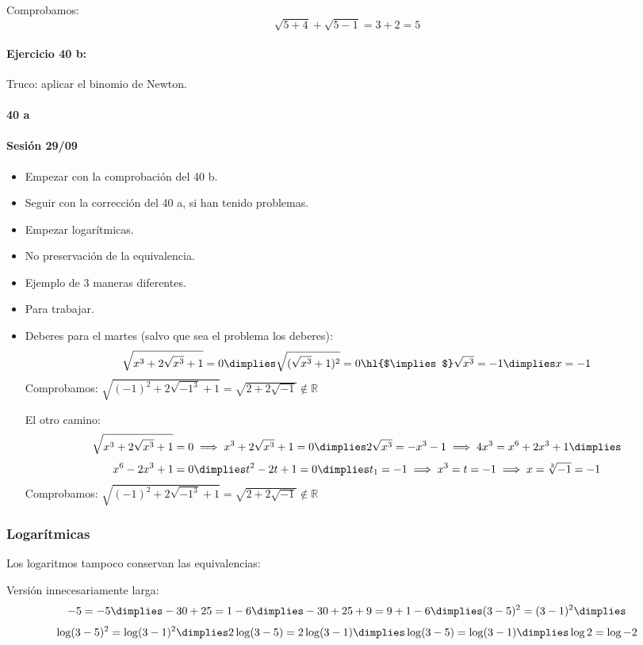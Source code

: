 \documentclass[palatino,nosec]{Docencia}
\begin{document}
Comprobamos:
\[
	\sqrt{5+4}+\sqrt{5-1} = 3+2 = 5
\]

\paragraph{Ejercicio 40 b:} Truco: aplicar el binomio de Newton.


\paragraph{40 a}

\paragraph{Sesión 29/09}
\begin{itemize}
	\item Empezar con la comprobación del 40 b.
	\item Seguir con la corrección del 40 a, si han tenido problemas.
	\item Empezar logarítmicas.
	\item No preservación de la equivalencia.
	\item Ejemplo de 3 maneras diferentes.
	\item Para trabajar.
	\item Deberes para el martes (salvo que sea el problema los deberes): 
	\[
		\sqrt{x^3+2\sqrt{x^3}+1} = 0 \dimplies \sqrt{(\sqrt{x^3}+1)^2} = 0 \text{\hl{$\implies$}} \sqrt{x^3}=-1 \dimplies x=-1
	\]
	Comprobamos: $\sqrt{(-1)^2+2\sqrt{-1^3}+1} = \sqrt{2+2\sqrt{-1}} \notin ℝ$

	El otro camino:
	\[
		\sqrt{x^3+2\sqrt{x^3}+1} = 0 \implies x^3+2\sqrt{x^3}+1 = 0 \dimplies 2\sqrt{x^3} = -x^3-1 \implies 4x^3=x^6+2x^3+1 \dimplies 
	\]
	\[
		x^6-2x^3+1=0 \dimplies t^2-2t+1=0 \dimplies t_1=-1 \implies x^3=t=-1\implies x=\sqrt[3]{-1}=-1
	\]
	Comprobamos: $\sqrt{(-1)^2+2\sqrt{-1^3}+1} = \sqrt{2+2\sqrt{-1}} \notin ℝ$

\end{itemize}

\subsubsection{Logarítmicas}

Los logaritmos tampoco conservan las equivalencias:

Versión innecesariamente larga:
\[
	-5 = -5 \dimplies -30+25 = 1-6 \dimplies -30+25+9 = 9+1-6 \dimplies (3-5)^2 = (3-1)^2 \dimplies 
\]
\[
	\log(3-5)^2 = \log(3-1)^2 \dimplies 2\log(3-5) = 2\log(3-1) \dimplies \log(3-5)=\log(3-1) \dimplies \log2=\log-2
\]
\end{document}
